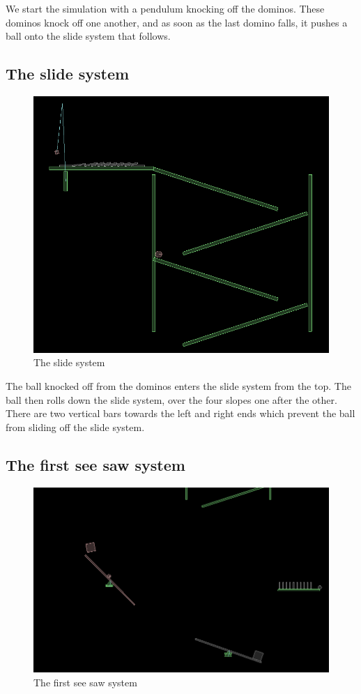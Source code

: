 \documentclass[a4paper,11pt]{article}
\begin{document}
         We start the simulation with a pendulum knocking off the dominos. These dominos knock off one another, and as soon as the last domino falls, it pushes a ball onto the slide system that follows.
         
  \subsection{The slide system}
  	\begin{figure}
	\includegraphics[scale=0.35]{05_ball_in_slides.png}
	\caption{The slide system}
	\end{figure}  
  
	The ball knocked off from the dominos enters the slide system from the top. The ball then rolls down the slide system, over the four slopes one after the other. There are two vertical bars towards the left and right ends which prevent the ball from sliding off the slide system.	
	
  \subsection{The first see saw system}
  	\begin{figure}
	\includegraphics[scale=0.35]{07_first_seesaw_impact.png}
	\caption{The first see saw system}
	\end{figure}  
  
\end{document}
